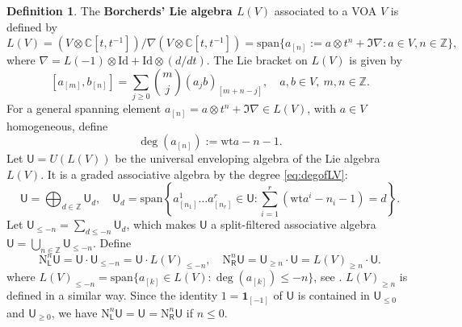 \documentclass[12pt,a4paper,reqno]{amsart}
\numberwithin{equation}{section}
\numberwithin{equation}{section}
\theoremstyle{definition}
\newtheorem{df}[thm]{Definition}
\newcommand{\Z}{\mathbb{Z}}
\def \C {\mathbb{C}}
\def \vac {\mathbf{1}}
\def\Id{\mathrm{Id}}
\def \wt {\mathrm{wt}}
\def\L{\mathcal{L}}
\def\ds{\dots}
\def\o{\otimes}
\def\spn{\mathrm{span}}
\def\rN{\mathrm{N}}
\def\L{\mathsf{L}}
\def\U{\mathsf{U}}
\def\rN{\mathrm{N}}
\def\L{\mathsf{L}}
\def\sR{\mathsf{R}}
\def\U{\mathsf{U}}
\begin{document}
\begin{df}\cite{B86,FZ92,DGK23}\label{Def:BorLie}
	The {\bf Borcherds' Lie algebra $L(V)$} associated to a VOA $V$ is defined by 
	$
	L(V)=(V\o \C[t,t^{-1}])/\nabla (V\o \C[t,t^{-1}])=\spn\{a_{[n]}:=a\o t^n+\Im \nabla: a\in V,n\in \Z \},
	$
	where $\nabla =L(-1)\o \Id+\Id\o (d/dt)$. The Lie bracket on $L(V)$ is given by 
	$$
	[a_{[m]},b_{[n]}]=\sum_{j\geq0} \binom{m}{j} (a_jb)_{[m+n-j]},\quad a,b\in V,\ m,n\in \Z.
	$$
	For a general spanning element $a_{[n]}=a\o t^n+\Im \nabla\in L(V)$, with $a\in V$ homogeneous, define 
	\begin{equation}\label{eq:degofLV}
		\deg (a_{[n]}):=\wt a-n-1. 
	\end{equation}
	Let $\U=U(L(V))$ be the universal enveloping algebra of the Lie algebra $L(V)$. It is a graded associative algebra  by the degree \eqref{eq:degofLV}: 
	$$
	\U=\bigoplus_{d\in \Z} \U_d,\quad \U_d=\spn\left\{a^1_{[n_1]}\ds a^r_{[n_r]}\in \U: \sum\limits_{i=1}^{r}\left(\wt a^i-n_i-1\right)=d \right\}.
	$$
	Let $\U_{\leq -n}=\sum_{d\leq -n} \U_d$, which makes $\U$ a split-filtered associative algebra $\U=\bigcup_{n\in \Z} \U_{\leq -n}$. Define
	\begin{equation}\label{eq:nei}
		\rN^n_\L \U=\U\cdot \U_{\leq -n}=\U\cdot L(V)_{\leq -n},\quad 	\rN^n_\sR \U=\U_{\geq n}\cdot \U=L(V)_{\geq n}\cdot \U.
	\end{equation}
	where $L(V)_{\leq -n}=\spn\{a_{[k]}\in L(V): \deg(a_{[k]})\leq -n\}$, see \cite[Lemma 2.4.2]{DGK23}. $L(V)_{\geq n}$ is defined in a similar way. Since the identity $1=\vac_{[-1]}$ of $\U$ is contained in $\U_{\leq 0}$ and $\U_{\geq 0}$, we have $\rN^n_\L \U=\U=\rN^n_\sR \U	$ if $n\leq 0$. 
	

\end{df}
\end{document}
